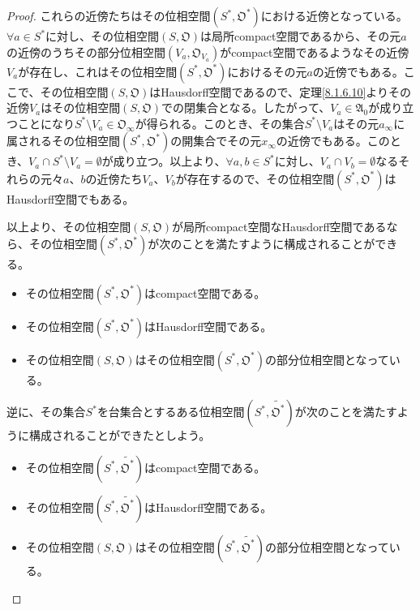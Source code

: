 \documentclass[dvipdfmx]{jsarticle}
\begin{document}
\begin{proof}
これらの近傍たちはその位相空間$\left( S^{*},\mathfrak{O}^{*} \right)$における近傍となっている。$\forall a \in S^{*}$に対し、その位相空間$\left( S,\mathfrak{O} \right)$は局所compact空間であるから、その元$a$の近傍のうちその部分位相空間$\left( V_{a},\mathfrak{O}_{V_{a}} \right)$がcompact空間であるようなその近傍$V_{a}$が存在し、これはその位相空間$\left( S^{*},\mathfrak{O}^{*} \right)$におけるその元$a$の近傍でもある。ここで、その位相空間$\left( S,\mathfrak{O} \right)$はHausdorff空間であるので、定理\ref{8.1.6.10}よりその近傍$V_{a}$はその位相空間$\left( S,\mathfrak{O} \right)$での閉集合となる。したがって、$V_{a} \in \mathfrak{A}_{0}$が成り立つことになり$S^{*} \setminus V_{a} \in \mathfrak{O}_{\infty}$が得られる。このとき、その集合$S^{*} \setminus V_{a}$はその元$a_{\infty}$に属されるその位相空間$\left( S^{*},\mathfrak{O}^{*} \right)$の開集合でその元$x_{\infty}$の近傍でもある。このとき、$V_{a} \cap S^{*} \setminus V_{a} = \emptyset$が成り立つ。以上より、$\forall a,b \in S^{*}$に対し、$V_{a} \cap V_{b} = \emptyset$なるそれらの元々$a$、$b$の近傍たち$V_{a}$、$V_{b}$が存在するので、その位相空間$\left( S^{*},\mathfrak{O}^{*} \right)$はHausdorff空間でもある。\par
以上より、その位相空間$\left( S,\mathfrak{O} \right)$が局所compact空間なHausdorff空間であるなら、その位相空間$\left( S^{*},\mathfrak{O}^{*} \right)$が次のことを満たすように構成されることができる。
\begin{itemize}
\item
  その位相空間$\left( S^{*},\mathfrak{O}^{*} \right)$はcompact空間である。
\item
  その位相空間$\left( S^{*},\mathfrak{O}^{*} \right)$はHausdorff空間である。
\item
  その位相空間$\left( S,\mathfrak{O} \right)$はその位相空間$\left( S^{*},\mathfrak{O}^{*} \right)$の部分位相空間となっている。
\end{itemize}\par
逆に、その集合$S^{*}$を台集合とするある位相空間$\left( S^{*},\widetilde{\mathfrak{O}^{*}} \right)$が次のことを満たすように構成されることができたとしよう。
\begin{itemize}
\item
  その位相空間$\left( S^{*},\widetilde{\mathfrak{O}^{*}} \right)$はcompact空間である。
\item
  その位相空間$\left( S^{*},\widetilde{\mathfrak{O}^{*}} \right)$はHausdorff空間である。
\item
  その位相空間$\left( S,\mathfrak{O} \right)$はその位相空間$\left( S^{*},\widetilde{\mathfrak{O}^{*}} \right)$の部分位相空間となっている。

\end{itemize}
\end{proof}
\end{document}
